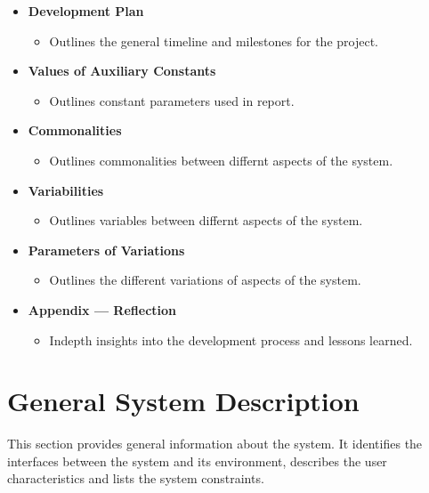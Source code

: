 \begin{itemize}
    \item \textbf{Development Plan} 
    \begin{itemize}
        \item Outlines the general timeline and milestones for the project.
    \end{itemize}
    
    \item \textbf{Values of Auxiliary Constants} 
    \begin{itemize}
        \item Outlines constant parameters used in report.
    \end{itemize}
    
    \item \textbf{Commonalities} 
    \begin{itemize}
        \item Outlines commonalities between differnt aspects of the system.
    \end{itemize}
    
    \item \textbf{Variabilities} 
    \begin{itemize}
        \item Outlines variables between differnt aspects of the system.
    \end{itemize}
    
    \item \textbf{Parameters of Variations} 
    \begin{itemize}
        \item Outlines the different variations of aspects of the system.
    \end{itemize}
    
    \item \textbf{Appendix — Reflection} 
    \begin{itemize}
        \item Indepth insights into the development process and lessons learned.
    \end{itemize}
\end{itemize}


\newpage
\section{General System Description}

This section provides general information about the system.  It identifies the
interfaces between the system and its environment, describes the user
characteristics and lists the system constraints.  

